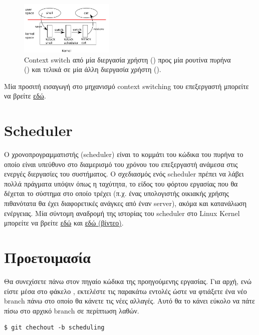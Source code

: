 \documentclass[18pt]{extarticle}
\begin{document}
\begin{figure}[H]
    \centering
    \includegraphics[width=0.4\textwidth]{assets/sched/switch.png}
    \caption{Context switch από μία διεργασία χρήστη () 
    προς μία ρουτίνα πυρήνα () και τελικά 
    σε μία άλλη διεργασία χρήστη ().}
\end{figure}

Μία προσιτή εισαγωγή στο μηχανισμό context switching του επεξεργαστή μπορείτε 
να βρείτε \href{https://cpu.land/slice-dat-time}{εδώ}.

\section{Scheduler}

Ο χρονοπρογραμματιστής (scheduler) είναι το κομμάτι του κώδικα του πυρήνα το οποίο 
είναι υπεύθυνο στο διαμερισμό του χρόνου του επεξεργαστή ανάμεσα στις ενεργές διεργασίες
του συστήματος. Ο σχεδιασμός ενός scheduler πρέπει να λάβει πολλά πράγματα υπόψιν
όπως η ταχύτητα, το είδος του φόρτου εργασίας που θα δέχεται το σύστημα στο οποίο τρέχει
(π.χ. ένας υπολογιστής οικιακής χρήσης πιθανότατα θα έχει διαφορετικές ανάγκες από έναν server), 
ακόμα και κατανάλωση ενέργειας. Μία σύντομη αναδρομή της ιστορίας του scheduler στο Linux Kernel
μπορείτε να βρείτε \href{https://dev.to/satorutakeuchi/a-brief-history-of-the-linux-kernel-s-process-scheduler-the-very-first-scheduler-v0-01-9e4}{εδώ} και \href{https://www.youtube.com/watch?v=XpFWPgofFR8}{εδώ (βίντεο)}.

\section{Προετοιμασία}

Θα συνεχίσετε πάνω στον πηγαίο κώδικα της προηγούμενης εργασίας. 
Για αρχή, ενώ είστε μέσα στο φάκελο , εκτελέστε τις παρακάτω  εντολές
ώστε να φτιάξετε ένα νέο branch πάνω στο οποίο θα κάνετε τις νέες αλλαγές. Αυτό 
θα το κάνει εύκολο να πάτε πίσω στο αρχικό branch σε περίπτωση λαθών.

\begin{commandline}
\begin{verbatim}
$ git chechout -b scheduling 
\end{verbatim}
\end{commandline}
\end{document}
